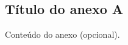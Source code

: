 \begin{anexosenv}
\partanexos   %

\chapter{Título do anexo A}
Conteúdo do anexo (opcional).

\end{anexosenv}
